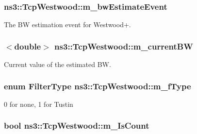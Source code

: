 \subsubsection[{\texorpdfstring{m\+\_\+bw\+Estimate\+Event}{m_bwEstimateEvent}}]{ ns3\+::\+Tcp\+Westwood\+::m\+\_\+bw\+Estimate\+Event\hspace{0.3cm}{\ttfamily [protected]}}\hypertarget{classns3_1_1TcpWestwood_aefc4b47ae1fd365e4b6777f80bfeca5c}{}\label{classns3_1_1TcpWestwood_aefc4b47ae1fd365e4b6777f80bfeca5c}


The BW estimation event for Westwood+. 

\subsubsection[{\texorpdfstring{m\+\_\+current\+BW}{m_currentBW}}]{$<$double$>$ ns3\+::\+Tcp\+Westwood\+::m\+\_\+current\+BW\hspace{0.3cm}{\ttfamily [protected]}}\hypertarget{classns3_1_1TcpWestwood_a6cd16270e13f4ba8f1da9d5aa3a6d90b}{}\label{classns3_1_1TcpWestwood_a6cd16270e13f4ba8f1da9d5aa3a6d90b}


Current value of the estimated BW. 

\subsubsection[{\texorpdfstring{m\+\_\+f\+Type}{m_fType}}]{\setlength{\rightskip}{0pt plus 5cm}enum {\bf Filter\+Type} ns3\+::\+Tcp\+Westwood\+::m\+\_\+f\+Type\hspace{0.3cm}{\ttfamily [protected]}}\hypertarget{classns3_1_1TcpWestwood_a2f18c4bdae2012bc39340c1d919e8495}{}\label{classns3_1_1TcpWestwood_a2f18c4bdae2012bc39340c1d919e8495}


0 for none, 1 for Tustin 

\subsubsection[{\texorpdfstring{m\+\_\+\+Is\+Count}{m_IsCount}}]{\setlength{\rightskip}{0pt plus 5cm}bool ns3\+::\+Tcp\+Westwood\+::m\+\_\+\+Is\+Count\hspace{0.3cm}{\ttfamily [protected]}}\hypertarget{classns3_1_1TcpWestwood_a453644ea26b8f0d95234f9f1a1a25573}{}\label{classns3_1_1TcpWestwood_a453644ea26b8f0d95234f9f1a1a25573}


